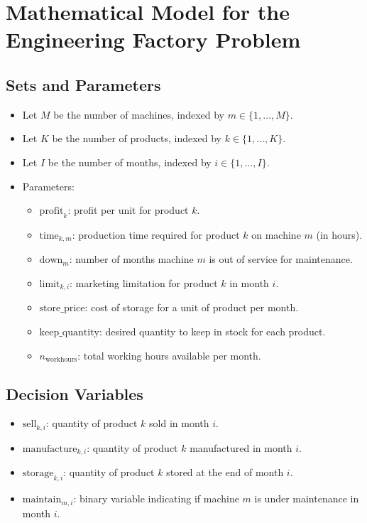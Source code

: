 \documentclass{article}
\begin{document}
\section*{Mathematical Model for the Engineering Factory Problem}

\subsection*{Sets and Parameters}
\begin{itemize}
    \item Let \( M \) be the number of machines, indexed by \( m \in \{1, \ldots, M\} \).
    \item Let \( K \) be the number of products, indexed by \( k \in \{1, \ldots, K\} \).
    \item Let \( I \) be the number of months, indexed by \( i \in \{1, \ldots, I\} \).
    
    \item Parameters:
    \begin{itemize}
        \item \( \text{profit}_{k} \): profit per unit for product \( k \).
        \item \( \text{time}_{k, m} \): production time required for product \( k \) on machine \( m \) (in hours).
        \item \( \text{down}_{m} \): number of months machine \( m \) is out of service for maintenance.
        \item \( \text{limit}_{k, i} \): marketing limitation for product \( k \) in month \( i \).
        \item \( \text{store\_price} \): cost of storage for a unit of product per month.
        \item \( \text{keep\_quantity} \): desired quantity to keep in stock for each product.
        \item \( n_{\text{workhours}} \): total working hours available per month.
    \end{itemize}
\end{itemize}

\subsection*{Decision Variables}
\begin{itemize}
    \item \( \text{sell}_{k, i} \): quantity of product \( k \) sold in month \( i \).
    \item \( \text{manufacture}_{k, i} \): quantity of product \( k \) manufactured in month \( i \).
    \item \( \text{storage}_{k, i} \): quantity of product \( k \) stored at the end of month \( i \).
    \item \( \text{maintain}_{m, i} \): binary variable indicating if machine \( m \) is under maintenance in month \( i \).
\end{itemize}
\end{document}
